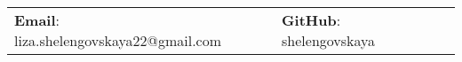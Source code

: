 \documentclass[letterpaper, 11pt]{article}
\begin{document}


\vspace{0.5cm} 
\begin{center}
\begin{tabular}{lll}
\textbf{Email}: liza.shelengovskaya22@gmail.com      &
\hspace{0.1in} \textbf{GitHub}: shelengovskaya   

\end{tabular}
\end{center}


\setlength{\tabcolsep}{4pt}
\end{document}
